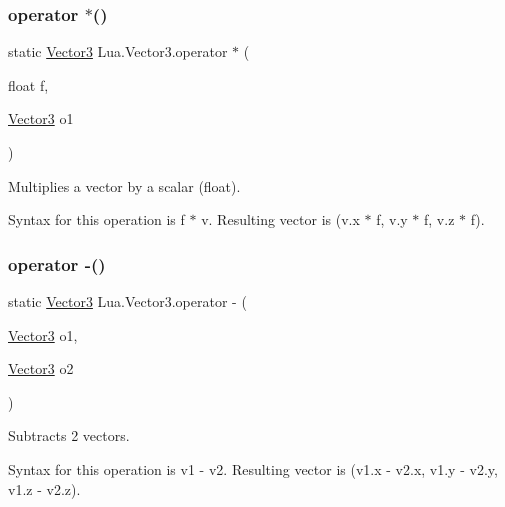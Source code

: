 \subsubsection{\texorpdfstring{operator $\ast$()}{operator *()}\hspace{0.1cm}{\footnotesize\ttfamily [2/2]}}
{\footnotesize\ttfamily static \mbox{\hyperlink{class_lua_1_1_vector3}{Vector3}} Lua.\+Vector3.\+operator $\ast$ (\begin{DoxyParamCaption}\item[{float}]{f,  }\item[{\mbox{\hyperlink{class_lua_1_1_vector3}{Vector3}}}]{o1 }\end{DoxyParamCaption})\hspace{0.3cm}{\ttfamily [static]}}



Multiplies a vector by a scalar (float). 

Syntax for this operation is {\ttfamily f $\ast$ v}. Resulting vector is {\ttfamily (v.\+x $\ast$ f, v.\+y $\ast$ f, v.\+z $\ast$ f)}. \mbox{\label{class_lua_1_1_vector3_a4acda611c59fd0012d1f2c3d1d5ef1ca}} 
\subsubsection{\texorpdfstring{operator -\/()}{operator -()}\hspace{0.1cm}{\footnotesize\ttfamily [1/2]}}
{\footnotesize\ttfamily static \mbox{\hyperlink{class_lua_1_1_vector3}{Vector3}} Lua.\+Vector3.\+operator -\/ (\begin{DoxyParamCaption}\item[{\mbox{\hyperlink{class_lua_1_1_vector3}{Vector3}}}]{o1,  }\item[{\mbox{\hyperlink{class_lua_1_1_vector3}{Vector3}}}]{o2 }\end{DoxyParamCaption})\hspace{0.3cm}{\ttfamily [static]}}



Subtracts 2 vectors. 

Syntax for this operation is {\ttfamily v1 -\/ v2}. Resulting vector is {\ttfamily (v1.\+x -\/ v2.\+x, v1.\+y -\/ v2.\+y, v1.\+z -\/ v2.\+z)}. \mbox{\label{class_lua_1_1_vector3_a9a7c5fab17a78a7eb42ee976ae6f3d5e}} 
